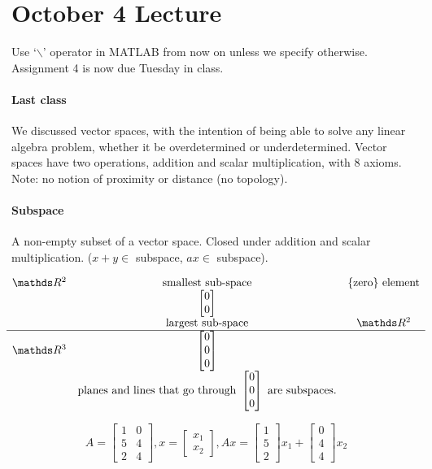 \section{October 4 Lecture}

Use `$\backslash$' operator in MATLAB from now on unless we specify otherwise. Assignment 4 is now due Tuesday in class.

\paragraph{Last class} We discussed vector spaces, with the intention of being able to solve any linear algebra problem, whether it be overdetermined or underdetermined. Vector spaces have two operations, addition and scalar multiplication, with 8 axioms. Note: no notion of proximity or distance (no topology).

\paragraph{Subspace} A non-empty subset of a vector space. Closed under addition and scalar multiplication. ($x+y \in$ subspace, $ax \in$ subspace).

\[
	\begin{matrix}
		\bbR^2 & \text{smallest sub-space} & \text{\{zero\} element} \\
		 & \begin{bmatrix}
		 	0 \\ 0
		 \end{bmatrix} \\
		 & \text{largest sub-space} & \bbR^2 \\\hline
		 \bbR^3 & \begin{bmatrix}
		 	0 \\ 0 \\0 
		 \end{bmatrix} \\
		 & \text{planes and lines that go through } \begin{bmatrix}
		 	0 \\ 0 \\ 0
		 \end{bmatrix} \text{ are subspaces.}
	\end{matrix}
\]

\[
	A = \begin{bmatrix}
		1 & 0 \\ 5 & 4 \\ 2 & 4
	\end{bmatrix},
	x = \begin{bmatrix}
		x_1 \\ x_2
	\end{bmatrix}, 
	Ax = \begin{bmatrix}
		1 \\ 5 \\ 2 
	\end{bmatrix} x_1 + 
	\begin{bmatrix}
		0 \\ 4 \\ 4
	\end{bmatrix} x_2
\]

